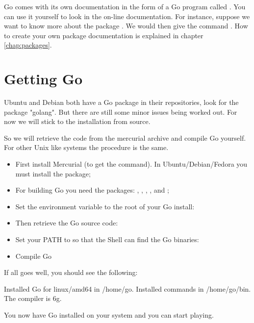 Go comes with its own documentation in the form of a Go program called
. 
You can use it yourself to look
in the on-line documentation. For
instance, suppose we want to know more about the package .
We would then give the command .
How to create your own package documentation
is explained in chapter \ref{chap:packages}.

\section{Getting Go}
Ubuntu and Debian both have a Go package in their repositories, look for
the package "golang". But there are still some minor issues being worked
out. For now we will stick to the installation from source.

So we will retrieve the code from the mercurial archive and compile
Go yourself. For other Unix like systems the procedure is the same.
\begin{itemize}
\item First install Mercurial (to get the  command). In
Ubuntu/Debian/Fedora you must install the  package;

\item For building Go you need the packages: ,
, , ,  and ;

\item Set the environment variable  to the root of your
Go install:
\begin{display}
\pr {}
\end{display}

\item Then retrieve the Go source code:
\begin{display}
\pr {}
\end{display}

\item Set your PATH to so that the Shell can find the Go binaries:
\begin{display}
\pr {}
\end{display}

\item Compile Go
\begin{display}
\pr {}
\pr {}
\end{display}
\end{itemize}
If all goes well, you should see the following:
\begin{display}
Installed Go for linux/amd64 in /home/go.
Installed commands in /home/go/bin.
The compiler is 6g.
\end{display}
You now have Go installed on your system and you can start playing.

